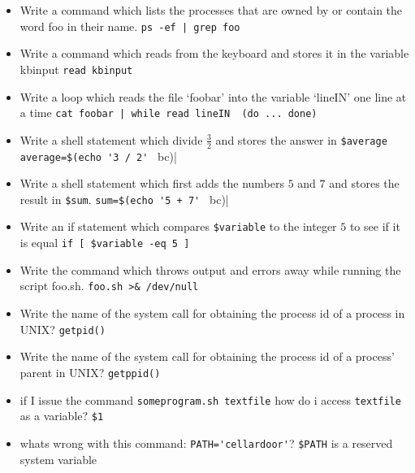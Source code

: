 \documentclass[10pt,landscape]{article}
\begin{document}
\begin{multicols}{4}
\begin{itemize}
    \item Write a command which lists the processes that are owned by or contain the word foo in their name. \verb$ps -ef | grep foo$
    \item Write a command which reads from the keyboard and stores it in the variable kbinput \verb$read kbinput$
    \item  Write a loop which reads the file `foobar' into the variable `lineIN' one line at a time
    \verb$cat foobar | while read lineIN  (do ... done)$
    \item Write a shell statement which divide $\frac{3}{2}$ and stores the answer in \verb|$average| \verb|average=$(echo '3 / 2' | bc)|
    \item Write a shell statement which first adds the numbers $5$ and $7$ and stores the result in \verb|$sum|. \verb|sum=$(echo '5 + 7' | bc)|
    \item Write an if statement which compares \verb|$variable| to the integer $5$ to see if it is equal \verb|if [ $variable -eq 5 ]|
    \item Write the command which throws output and errors away while running the script foo.sh. \verb|foo.sh >& /dev/null|
    \item Write the name of the system call for obtaining the process id of a process in UNIX? \verb|getpid()|
    \item Write the name of the system call for obtaining the process id of a process' parent in UNIX?  \verb|getppid()|
    \item if I issue the command \verb|someprogram.sh textfile| how do i access \verb|textfile| as a variable? \verb|$1|
    \item whats wrong with this command: \verb|PATH='cellardoor'|? \verb|$PATH| is a reserved system variable
\end{itemize}

\end{multicols}
\end{document}
